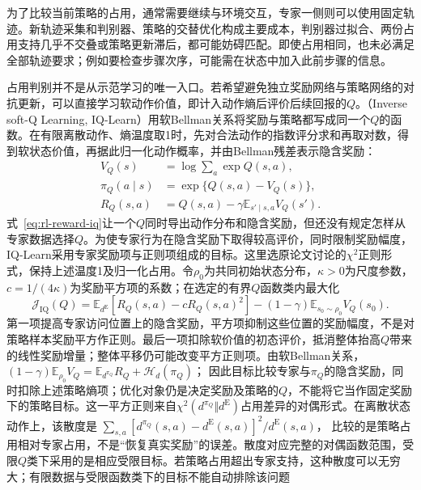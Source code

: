 为了比较当前策略的占用，通常需要继续与环境交互，专家一侧则可以使用固定轨迹。新轨迹采集和判别器、策略的交替优化构成主要成本，判别器过拟合、两份占用支持几乎不交叠或策略更新滞后，都可能妨碍匹配。即使占用相同，也未必满足全部轨迹要求；例如要检查步骤次序，可能需在状态中加入此前步骤的信息。

占用判别并不是从示范学习的唯一入口。若希望避免独立奖励网络与策略网络的对抗更新，可以直接学习软动作价值，即计入动作熵后评价后续回报的$Q$。（Inverse soft-Q Learning, IQ-Learn）用软Bellman关系将奖励与策略都写成同一个$Q$的函数。在有限离散动作、熵温度取1时，先对合法动作的指数评分求和再取对数，得到软状态价值，再据此归一化动作概率，并由Bellman残差表示隐含奖励：
\begin{equation}
  \begin{aligned}
    V_Q(s)&=\log\sum_a\exp Q(s,a),\\
    \pi_Q(a\mid s)&=\exp\{Q(s,a)-V_Q(s)\},\\
    R_Q(s,a)&=Q(s,a)-\gamma\mathbb E_{s'\mid s,a}V_Q(s').
  \end{aligned}
  \label{eq:rl-reward-iq}
\end{equation}
式~\eqref{eq:rl-reward-iq}让一个$Q$同时导出动作分布和隐含奖励，但还没有规定怎样从专家数据选择$Q$。为使专家行为在隐含奖励下取得较高评价，同时限制奖励幅度，IQ-Learn采用专家奖励项与正则项组成的目标。这里选原论文讨论的$\chi^2$正则形式，保持上述温度1及归一化占用。令$\rho_0$为共同初始状态分布，$\kappa>0$为尺度参数，$c=1/(4\kappa)$为奖励平方项的系数；在选定的有界$Q$函数类内最大化
\[
  \mathcal J_{\mathrm{IQ}}(Q)
  =\mathbb E_{d^{\mathrm E}}
       \left[R_Q(s,a)-cR_Q(s,a)^2\right]
     -(1-\gamma)\mathbb E_{s_0\sim\rho_0}V_Q(s_0).
\]
第一项提高专家访问位置上的隐含奖励，平方项抑制这些位置的奖励幅度，不是对策略样本奖励平方作正则。最后一项扣除软价值的初态评价，抵消整体抬高$Q$带来的线性奖励增量；整体平移仍可能改变平方正则项。由软Bellman关系，
$(1-\gamma)\mathbb E_{\rho_0}V_Q
=\mathbb E_{d^{\pi_Q}}R_Q+\mathcal H_d(\pi_Q)$；
因此目标比较专家与$\pi_Q$的隐含奖励，同时扣除上述策略熵项；优化对象仍是决定奖励及策略的$Q$，不能将它当作固定奖励下的策略目标。这一平方正则来自$\chi^2(d^{\pi_Q}\Vert d^{\mathrm E})$占用差异的对偶形式。在离散状态动作上，该散度是
$\sum_{s,a}[d^{\pi_Q}(s,a)-d^{\mathrm E}(s,a)]^2/d^{\mathrm E}(s,a)$，
比较的是策略占用相对专家占用，不是“恢复真实奖励”的误差。散度对应完整的对偶函数范围，受限$Q$类下采用的是相应受限目标。若策略占用超出专家支持，这种散度可以无穷大；有限数据与受限函数类下的目标不能自动排除该问题

